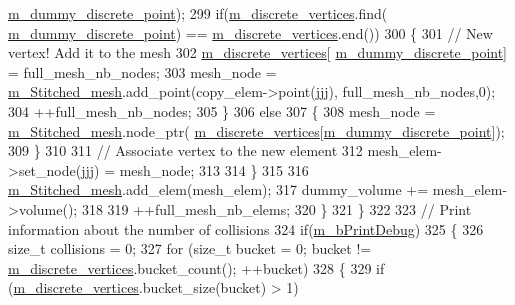 \begin{DoxyCode}
      \hyperlink{classcarl_1_1_stitch___meshes_a254b2b118a6bcabe7ebeeee083f03a9a}{m\_dummy\_discrete\_point});
299                 \textcolor{keywordflow}{if}(\hyperlink{classcarl_1_1_stitch___meshes_a3fa40b0605f44524589a60be157a8a87}{m\_discrete\_vertices}.find(
      \hyperlink{classcarl_1_1_stitch___meshes_a254b2b118a6bcabe7ebeeee083f03a9a}{m\_dummy\_discrete\_point}) == \hyperlink{classcarl_1_1_stitch___meshes_a3fa40b0605f44524589a60be157a8a87}{m\_discrete\_vertices}.end())
300                 \{
301                     \textcolor{comment}{// New vertex! Add it to the mesh}
302                     \hyperlink{classcarl_1_1_stitch___meshes_a3fa40b0605f44524589a60be157a8a87}{m\_discrete\_vertices}[
      \hyperlink{classcarl_1_1_stitch___meshes_a254b2b118a6bcabe7ebeeee083f03a9a}{m\_dummy\_discrete\_point}] = full\_mesh\_nb\_nodes;
303                     mesh\_node = \hyperlink{classcarl_1_1_stitch___meshes_abebb40f413d1dbce1d74f9280e978ed7}{m\_Stitched\_mesh}.add\_point(copy\_elem->point(jjj),
      full\_mesh\_nb\_nodes,0);
304                     ++full\_mesh\_nb\_nodes;
305                 \}
306                 \textcolor{keywordflow}{else}
307                 \{
308                     mesh\_node = \hyperlink{classcarl_1_1_stitch___meshes_abebb40f413d1dbce1d74f9280e978ed7}{m\_Stitched\_mesh}.node\_ptr(
      \hyperlink{classcarl_1_1_stitch___meshes_a3fa40b0605f44524589a60be157a8a87}{m\_discrete\_vertices}[\hyperlink{classcarl_1_1_stitch___meshes_a254b2b118a6bcabe7ebeeee083f03a9a}{m\_dummy\_discrete\_point}]);
309                 \}
310 
311                 \textcolor{comment}{// Associate vertex to the new element}
312                 mesh\_elem->set\_node(jjj) = mesh\_node;
313 
314             \}
315 
316             \hyperlink{classcarl_1_1_stitch___meshes_abebb40f413d1dbce1d74f9280e978ed7}{m\_Stitched\_mesh}.add\_elem(mesh\_elem);
317             dummy\_volume += mesh\_elem->volume();
318 
319             ++full\_mesh\_nb\_elems;
320         \}
321     \}
322 
323     \textcolor{comment}{// Print information about the number of collisions}
324     \textcolor{keywordflow}{if}(\hyperlink{classcarl_1_1_stitch___meshes_aeb94b2d2b28624414fd00e02ec9a97e0}{m\_bPrintDebug})
325     \{
326         \textcolor{keywordtype}{size\_t} collisions = 0;
327         \textcolor{keywordflow}{for} (\textcolor{keywordtype}{size\_t} bucket = 0; bucket != \hyperlink{classcarl_1_1_stitch___meshes_a3fa40b0605f44524589a60be157a8a87}{m\_discrete\_vertices}.bucket\_count(); ++bucket)
328         \{
329             \textcolor{keywordflow}{if} (\hyperlink{classcarl_1_1_stitch___meshes_a3fa40b0605f44524589a60be157a8a87}{m\_discrete\_vertices}.bucket\_size(bucket) > 1)

\end{DoxyCode}
